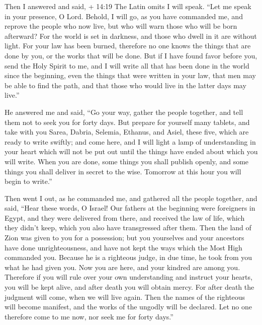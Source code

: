 Then I answered and said, + 14:19 The Latin omits I will
speak. ``Let me speak in your presence, O Lord.  Behold, I
will go, as you have commanded me, and reprove the people who now live,
but who will warn those who will be born afterward? For the world is set
in darkness, and those who dwell in it are without light. 
For your law has been burned, therefore no one knows the things that are
done by you, or the works that will be done.  But if I have
found favor before you, send the Holy Spirit to me, and I will write all
that has been done in the world since the beginning, even the things
that were written in your law, that men may be able to find the path,
and that those who would live in the latter days may live.''

 He answered me and said, ``Go your way, gather the people
together, and tell them not to seek you for forty days. 
But prepare for yourself many tablets, and take with you Sarea, Dabria,
Selemia, Ethanus, and Asiel, these five, which are ready to write
swiftly;  and come here, and I will light a lamp of
understanding in your heart which will not be put out until the things
have ended about which you will write.  When you are done,
some things you shall publish openly, and some things you shall deliver
in secret to the wise. Tomorrow at this hour you will begin to write.''

 Then went I out, as he commanded me, and gathered all the
people together, and said,  ``Hear these words, O Israel!
 Our fathers at the beginning were foreigners in Egypt, and
they were delivered from there,  and received the law of
life, which they didn't keep, which you also have transgressed after
them.  Then the land of Zion was given to you for a
possession; but you yourselves and your ancestors have done
unrighteousness, and have not kept the ways which the Most High
commanded you.  Because he is a righteous judge, in due
time, he took from you what he had given you.  Now you are
here, and your kindred are among you.  Therefore if you
will rule over your own understanding and instruct your hearts, you will
be kept alive, and after death you will obtain mercy.  For
after death the judgment will come, when we will live again. Then the
names of the righteous will become manifest, and the works of the
ungodly will be declared.  Let no one therefore come to me
now, nor seek me for forty days.''


